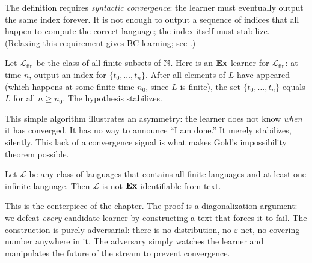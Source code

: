 The definition requires \emph{syntactic convergence}: the learner must eventually output the same index forever. It is not enough to output a sequence of indices that all happen to compute the correct language; the index itself must stabilize. (Relaxing this requirement gives BC-learning; see .)

\begin{example}
\label{ex:finite-languages}
Let $\mathcal{L}_{\mathrm{fin}}$ be the class of all finite subsets of $\mathbb{N}$. Here is an $\mathbf{Ex}$-learner for $\mathcal{L}_{\mathrm{fin}}$: at time $n$, output an index for $\{t_0, \ldots, t_n\}$. After all elements of $L$ have appeared (which happens at some finite time $n_0$, since $L$ is finite), the set $\{t_0, \ldots, t_n\}$ equals $L$ for all $n \geq n_0$. The hypothesis stabilizes.
\end{example}

This simple algorithm illustrates an asymmetry: the learner does not know \emph{when} it has converged. It has no way to announce ``I am done.'' It merely stabilizes, silently. This lack of a convergence signal is what makes Gold's impossibility theorem possible.

\begin{thm}
\label{thm:gold}
Let $\mathcal{L}$ be any class of languages that contains all finite languages and at least one infinite language. Then $\mathcal{L}$ is not $\mathbf{Ex}$-identifiable from text.
\end{thm}

This is the centerpiece of the chapter. The proof is a diagonalization argument: we defeat \emph{every} candidate learner by constructing a text that forces it to fail. The construction is purely adversarial: there is no distribution, no $\varepsilon$-net, no covering number anywhere in it. The adversary simply watches the learner and manipulates the future of the stream to prevent convergence.

